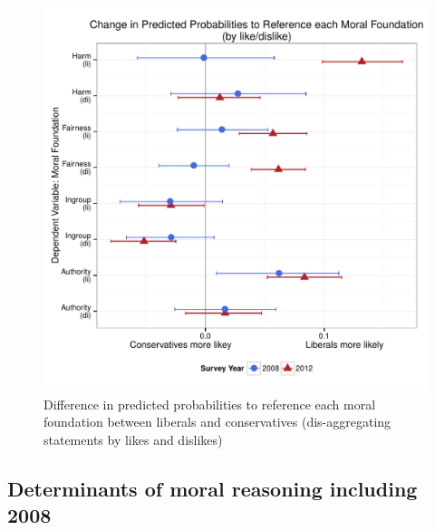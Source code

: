 \documentclass[12pt]{article}
\begin{document}
\begin{figure}\centering
\includegraphics[scale=.4]{../calc/fig/appD6lidi.pdf}
\caption{Difference in predicted probabilities to reference each moral foundation between liberals and conservatives (dis-aggregating statements by likes and dislikes)}\label{fig:appD6lidi}
\end{figure}


\subsection{Determinants of moral reasoning including 2008}
\end{document}
